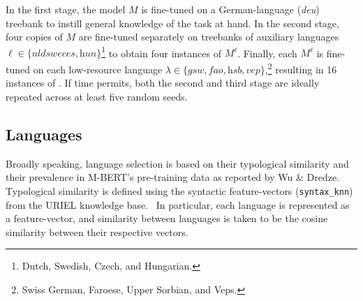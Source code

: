 	In the first stage, the model $M$ is fine-tuned on a German-language (\textit{deu}) treebank to instill general knowledge of the task at hand. In the second stage, four copies of $M$ are fine-tuned separately on treebanks of auxiliary languages $\ell \in \{\textit{nld}\textit{swe}\textit{ces}, \textit{hun}\}$\footnote{Dutch, Swedish, Czech, and Hungarian.} to obtain four instances of $M^\ell$. Finally, each $M^\ell$ is fine-tuned on each low-resource language $\lambda \in \{\textit{gsw}, \textit{fao}, \textit{hsb}, \textit{vep}\}$,\footnote{Swiss German, Faroese, Upper Sorbian, and Veps.} resulting in 16 instances of \m{\ell}{\lambda}. If time permits, both the second and third stage are ideally repeated across at least five random seeds.





\subsection{Languages}
\label{sub:languages}
	Broadly speaking, language selection is based on their typological similarity and their prevalence in M-BERT's pre-training data as reported by Wu \& Dredze.~\cite{wu-dredze-2020-languages} Typological similarity is defined using the syntactic feature-vectors (\texttt{syntax\_knn}) from the URIEL knowledge base.~\cite{littell-etal-2017-uriel} In particular, each language is represented as a feature-vector, and similarity between languages is taken to be the cosine similarity between their respective vectors.

